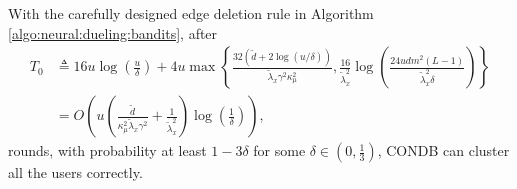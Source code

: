 \begin{lemma}\label{T0 lemma neural}
    With the carefully designed edge deletion rule in Algorithm \ref{algo:neural:dueling:bandits}, after 
\begin{equation*}
    \begin{aligned}
        T_0&\triangleq 16u\log(\frac{u}{\delta})+4u \max\left\{\frac{32 \left( \widetilde{d} + 2\log(u/\delta)\right)}{\tilde{\lambda}_x \gamma^2 \kappa_\mu^2},  \frac{16}{\tilde{\lambda}_x^2}\log(\frac{24u d m^2(L-1)}{\tilde{\lambda}_x^2\delta}) \right\}\\
        &= O\left(u \left( \frac{ \widetilde{d}}{\kappa_\mu^2\tilde{\lambda}_x \gamma^2} + \frac{1}{\tilde{\lambda}_x^2} \right)\log(\frac{1}{\delta}) \right),
    \end{aligned}
\end{equation*}
rounds, with probability at least $1-3\delta$ for some $\delta\in(0,\frac{1}{3})$, CONDB can cluster all the users correctly.
\end{lemma}
